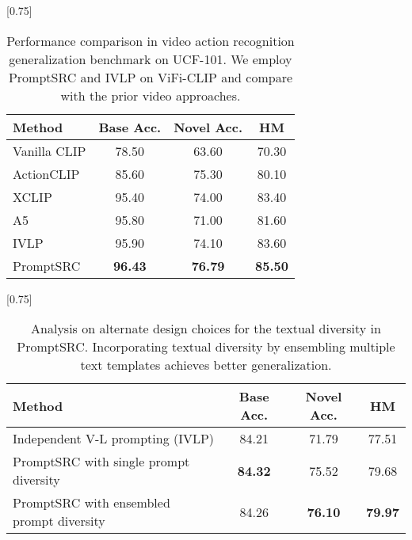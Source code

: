 \documentclass[10pt,twocolumn,letterpaper]{article}
\begin{document}
\begin{table}[t!]
    \small \centering
 \setlength{\tabcolsep}{20pt}
    \scalebox{0.75}[0.75]{
    \begin{tabular}{lccc}
    \toprule
    Method  & Base Acc. & Novel Acc. & HM\\
    \midrule
Vanilla CLIP  & 78.50 & 63.60  & 70.30 \\
    ActionCLIP &  {85.60 } & {75.30} & {{80.10}}\\
    XCLIP   & 95.40  & 74.00 & 83.40 \\
    A5 &  {95.80  } & {71.00} & {81.60}\\
    \midrule
    IVLP & 95.90 & 74.10 & 83.60 \\
   \rowcolor{tabhighlight}  PromptSRC &  \textbf{96.43 } & \textbf{76.79} & \textbf{85.50}\\
    \bottomrule
    \end{tabular}}\vspace{-0.5em}
    \caption{Performance comparison in video action recognition generalization benchmark on UCF-101. We employ PromptSRC and IVLP on ViFi-CLIP and compare with the prior video approaches.}
    \label{tab_appendix:video_task}
\end{table} \begin{table}[!t]
    \small \centering
 \setlength{\tabcolsep}{6pt}
    \scalebox{0.75}[0.75]{
    \begin{tabular}{l cc | c }
    \toprule
    Method  & Base Acc. & Novel Acc. & HM\\
    \midrule
    Independent V-L prompting (IVLP) & 84.21 & 71.79 & 77.51 \\
    PromptSRC with single prompt diversity & \textbf{84.32}	&75.52&	79.68 \\
    \rowcolor{tabhighlight}
    PromptSRC with ensembled prompt diversity & {84.26} & \textbf{76.10} & \textbf{79.97} \\
    \bottomrule
    \end{tabular}
    }\vspace{-0.5em}
    \caption{Analysis on alternate design choices for the textual diversity in PromptSRC. Incorporating textual diversity by ensembling multiple text templates achieves better generalization.
    }
    \label{tab_appendix:alternate_textual_diversity}
\end{table} 
\end{document}
